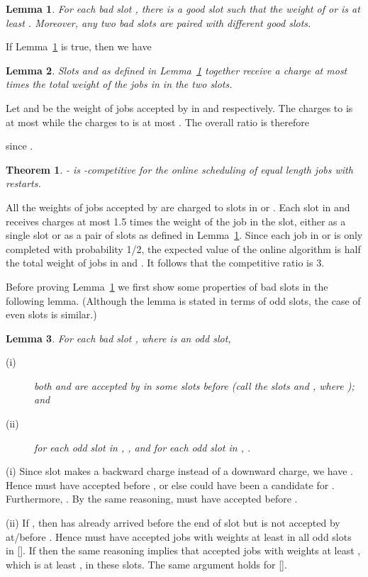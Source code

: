 \documentclass[11pt]{article}
\newtheorem{theorem}{Theorem}[section]
\newtheorem{lemma}{Lemma}[section]
\newcommand{\qed}{\hspace*{\fill}\par\medskip}
\newenvironment{proof}{\noindent{\it Proof. }\ignorespaces}{\qed}
\begin{document}
\begin{lemma} \label{lem:match-slots}
For each bad slot , there is a good slot  such that 
the weight of  or  is at least .  
Moreover, any two bad slots are paired with different good slots.
\end{lemma}

If Lemma~\ref{lem:match-slots} is true, then we have

\begin{lemma}
Slots  and  as defined in Lemma~\ref{lem:match-slots} together 
receive a charge at most  times the total weight of the jobs in 
in the two slots.
\end{lemma}
\begin{proof}
Let  and  be the weight of jobs accepted by  in  and 
respectively.
The charges to  is at most  while the charges to 
is at most .  The overall ratio is therefore

since . 
\end{proof}

\begin{theorem}
- is -competitive for the online scheduling of equal length jobs 
with restarts.
\end{theorem}
\begin{proof}
All the weights of jobs accepted by  
are charged to slots in  or .
Each slot in  and  receives charges at most 1.5 times the weight
of the job in the slot,
either as a single slot or as a pair of slots as defined in 
Lemma~\ref{lem:match-slots}.  
Since each job in  or  is only completed 
with probability 1/2, the expected value of the online algorithm is half the
total weight of jobs in  and .  
It follows that the competitive ratio is 3. 
\end{proof}

Before proving Lemma~\ref{lem:match-slots}
we first show some properties of bad slots in the following
lemma.  (Although the lemma is stated in terms of odd slots,
the case of even slots is similar.)

\begin{lemma} \label{lem:badslot}
For each bad slot , where  is an odd slot,
\begin{description}
\item[(i)]
both  and  are accepted
by  in some slots before  (call the slots 
and , where ); and
\item[(ii)]
for each odd slot  in ,
, and
for each odd slot  in ,
.
\end{description}
\end{lemma}
\begin{proof}
(i) Since slot  makes a backward charge
instead of a downward charge, we have .  
Hence  must have accepted  before ,
or else  could have been a candidate for .
Furthermore, .
By the same reasoning,  must have accepted  before .

\noindent (ii)
If , then  has already arrived before the end of 
slot  but is not accepted by  at/before .
Hence  must have accepted jobs with weights at least 
in all odd slots in [].
If  then the same reasoning implies that 
 accepted jobs with weights at least , which is at
least , in these slots.
The same argument holds for []. \end{proof}
\end{document}
